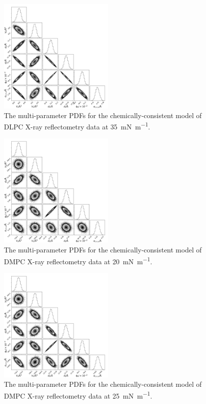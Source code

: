 \documentclass[amsmath,amssymb,superscriptaddress]{revtex4-1}
\begin{document}
\begin{figure}[H]
	\centering
	\includegraphics[width=0.50\textwidth]{figures/dlpc4_all_corner}
	\caption{The multi-parameter PDFs for the chemically-consistent model of DLPC X-ray reflectometry data at \SI{35}{\milli\newton\per\meter}.}
	\label{fig:dlpc4}
\end{figure}
\begin{figure}[H]
	\centering
	\includegraphics[width=0.50\textwidth]{figures/dmpc1_all_corner}
	\caption{The multi-parameter PDFs for the chemically-consistent model of DMPC X-ray reflectometry data at \SI{20}{\milli\newton\per\meter}.}
	\label{fig:dmpc1}
\end{figure}
\begin{figure}[H]
	\centering
	\includegraphics[width=0.50\textwidth]{figures/dmpc2_all_corner}
	\caption{The multi-parameter PDFs for the chemically-consistent model of DMPC X-ray reflectometry data at \SI{25}{\milli\newton\per\meter}.}
	\label{fig:dmpc2}
\end{figure}
\end{document}
